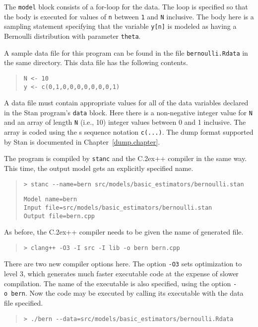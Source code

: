 \documentclass[10pt]{report}
\newcommand{\Stan}{Stan\xspace}
\newcommand{\stanc}{{\tt stanc}\xspace}
\newcommand*{\Cpp}{C\raise.2ex\hbox{\footnotesize ++}\xspace} %
\newcommand{\acronym}[1]{{\sc #1}\xspace}
\newcommand{\SPLUS}{\acronym{s}}
\newcommand{\code}[1]{{\tt #1}}
\newcommand{\refchapter}[1]{Chapter~\ref{#1.chapter}}
\begin{document}
The \code{model} block consists of a for-loop for the data.   The loop is
specified so that the body is executed for values of \code{n} between
\code{1} and \code{N} inclusive.  The body here is a sampling
statement specifying that the variable \code{y[n]} is modeled as
having a Bernoulli distribution with parameter \code{theta}.  

A sample data file for this program can be found in the file
\code{bernoulli.Rdata} in the same directory.  This data file has
the following contents.
%
\begin{quote}
\begin{Verbatim}
N <- 10
y <- c(0,1,0,0,0,0,0,0,0,1)
\end{Verbatim}
\end{quote}
%
A data file must contain appropriate values for all of the data
variables declared in the \Stan program's \code{data} block.  Here there
is a non-negative integer value for \code{N} and an array of length
\code{N} (i.e., 10) integer values between 0 and 1 inclusive.  The
array is coded using the \SPLUS sequence notation \code{c(...)}.
The dump format supported by \Stan is documented in \refchapter{dump}.

The program is compiled by \stanc and the \Cpp compiler in the same
way.  This time, the output model gets an explicitly specified name.
%
%
\begin{quote}
\begin{Verbatim}[fontshape=sl]
> stanc --name=bern src/models/basic_estimators/bernoulli.stan 
\end{Verbatim}
\begin{Verbatim}
Model name=bern
Input file=src/models/basic_estimators/bernoulli.stan
Output file=bern.cpp
\end{Verbatim}
\end{quote}
%
As before, the \Cpp compiler needs to be given the name of
generated file.
%
\begin{quote}
\begin{Verbatim}[fontshape=sl]
> clang++ -O3 -I src -I lib -o bern bern.cpp
\end{Verbatim}
\end{quote}
%
There are two new compiler options here.  The option \code{-O3} sets
optimization to level 3, which generates much faster executable
code at the expense of slower compilation.  The name of the
executable is also specified, using the option \code{-o~bern}.  Now
the code may be executed by calling its executable with the data file
specified. 
%
\begin{quote}
\begin{Verbatim}[fontshape=sl]
> ./bern --data=src/models/basic_estimators/bernoulli.Rdata
\end{Verbatim}
\end{quote}
\end{document}
